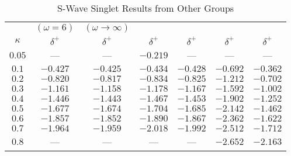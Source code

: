 \documentclass[Dissertation.tex]{subfiles}
\begin{document}
\begin{table}[H]
\begin{center}
\begin{tabular}{c c c c c c c}
\toprule
 & $(\omega = 6)$ & $(\omega \rightarrow \infty)$ &  &  &  & \\
$\kappa$ & $\delta^+$ \cite{VanReeth2003} & $\delta^+$ \cite{VanReeth2003} & $\delta^+$ \cite{Blackwood2002} & $\delta^+$ \cite{Walters2004} & $\delta^+$ \cite{Ray1997} & $\delta^+$ \cite{Adhikari1999} \\
\midrule
$0.05$ & --- & --- & $-0.219$ & --- & --- & --- \\
$0.1$ & $-0.427$ & $-0.425$ & $-0.434$ & $-0.428$ & $-0.692$ & $-0.362$ \\
$0.2$ & $-0.820$ & $-0.817$ & $-0.834$ & $-0.825$ & $-1.212$ & $-0.702$ \\
$0.3$ & $-1.161$ & $-1.158$ & $-1.178$ & $-1.167$ & $-1.592$ & $-1.002$ \\
$0.4$ & $-1.446$ & $-1.443$ & $-1.467$ & $-1.453$ & $-1.902$ & $-1.252$ \\
$0.5$ & $-1.677$ & $-1.674$ & $-1.704$ & $-1.685$ & $-2.142$ & $-1.462$ \\
$0.6$ & $-1.857$ & $-1.852$ & $-1.890$ & $-1.867$ & $-2.362$ & $-1.622$ \\
$0.7$ & $-1.964$ & $-1.959$ & $-2.018$ & $-1.992$ & $-2.512$ & $-1.712$ \\
$0.8$ &    --- &    --- &    --- &    --- & $-2.652$ & $-2.163$ \\
\bottomrule
\end{tabular}
\caption{S-Wave Singlet Results from Other Groups}
\label{tab:SWaveSingletOther}
\end{center}
\end{table}
\end{document}
